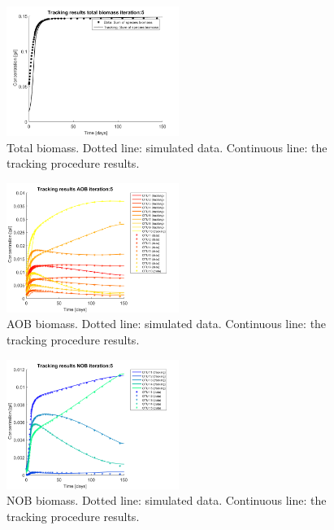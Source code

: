 \documentclass[3p,times]{elsarticle}
\begin{document}
\begin{figure}[h]
	\centering
	\includegraphics[width=0.5\textwidth]{Synthetic_data_no_noise//221119_no_noise_Biomass_Iter_5}
	\caption{Total biomass. Dotted line: simulated data. Continuous line: the tracking procedure results.}
	\label{Total Biomass no noise}
\end{figure}
\begin{figure}[h]
	\centering
	\includegraphics[width=0.5\textwidth]{Synthetic_data_no_noise//221119_no_noise_AOB_Iter_5}
	\caption{AOB biomass. Dotted line: simulated data. Continuous line: the tracking procedure results.}
	\label{AOB no noise}
\end{figure}
\begin{figure}[h]
	\centering
	\includegraphics[width=0.5\textwidth]{Synthetic_data_no_noise//221119_no_noise_NOB_Iter_5}
	\caption{NOB biomass. Dotted line: simulated data. Continuous line: the tracking procedure results.}
	\label{NOB no noise}
\end{figure}
\end{document}
